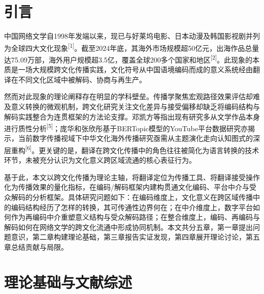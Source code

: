 \documentclass[12pt, a4paper]{article}
\newcommand{\citemark}[1]{\textsuperscript{[#1]}}
\begin{document}
\vspace{2pt}

\vspace{12pt}

\section{引言}

中国网络文学自1998年发端以来，现已与好莱坞电影、日本动漫及韩国影视剧并列为全球四大文化现象\citemark{1}。截至2024年底，其海外市场规模超50亿元，出海作品总量达75.09万部，海外用户规模超3.5亿，覆盖全球200多个国家和地区\citemark{2}。此现象的本质是一场大规模跨文化传播实践，文化符号从中国语境编码而成的意义系统经由翻译在不同文化区域中被解码、协商与再生产。

然而对此现象的理论阐释存在明显的学科壁垒。传播学聚焦宏观路径效果评估却难及意义转换的微观机制，跨文化研究关注文化差异与接受偏移却缺乏将编码结构与解码实践整合为连贯框架的方法论支撑。邓凯方等指出现有研究多从文学作品本身进行质性分析\citemark{5}；庞华和张欣彤基于BERTopic模型的YouTube平台数据研究亦揭示，当前数字传播视域下中华文化海外传播研究亟需从主题演化走向认知图式的深层重构\citemark{6}。更关键的是，翻译在跨文化传播中的角色往往被简化为语言转换的技术环节，未被充分认识为文化意义跨区域流通的核心表征行为。

基于此，本文以跨文化传播为理论主轴，将翻译定位为传播工具、将翻译接受操作化为传播效果的量化指标，在编码/解码框架内建构贯通文化编码、平台中介与受众解码的分析框架。具体研究问题如下：在编码维度上，文化意义在跨区域传播中的编码结构经历了怎样的转换，其可传通性边界何在；在中介维度上，数字平台如何作为再编码中介重塑意义结构与受众解码路径；在整合维度上，编码、再编码与解码如何在网络文学的跨文化流通中形成协同机制。本文共分五章，第一章提出问题意识，第二章构建理论基础，第三章报告实证发现，第四章展开理论讨论，第五章总结贡献与局限。

\section{理论基础与文献综述}
\end{document}
